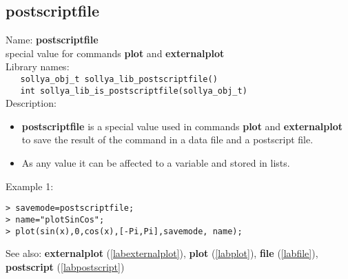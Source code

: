 \subsection{postscriptfile}
\label{labpostscriptfile}
\noindent Name: \textbf{postscriptfile}\\
\phantom{aaa}special value for commands \textbf{plot} and \textbf{externalplot}\\[0.2cm]
\noindent Library names:\\
\verb|   sollya_obj_t sollya_lib_postscriptfile()|\\
\verb|   int sollya_lib_is_postscriptfile(sollya_obj_t)|\\[0.2cm]
\noindent Description: \begin{itemize}

\item \textbf{postscriptfile} is a special value used in commands \textbf{plot} and \textbf{externalplot} to save
   the result of the command in a data file and a postscript file.

\item As any value it can be affected to a variable and stored in lists.
\end{itemize}
\noindent Example 1: 
\begin{center}\begin{minipage}{15cm}\begin{Verbatim}[frame=single,commandchars=\\\|\~]
> savemode=postscriptfile;
> name="plotSinCos";
> plot(sin(x),0,cos(x),[-Pi,Pi],savemode, name);
\end{Verbatim}
\end{minipage}\end{center}
See also: \textbf{externalplot} (\ref{labexternalplot}), \textbf{plot} (\ref{labplot}), \textbf{file} (\ref{labfile}), \textbf{postscript} (\ref{labpostscript})
